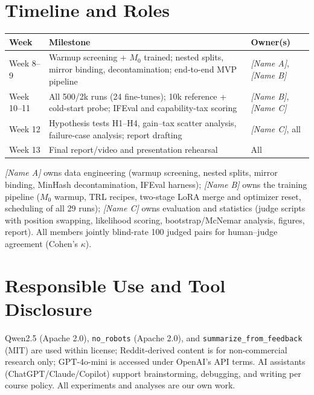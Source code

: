 \documentclass[11pt]{article}
\newcommand{\tempnote}[1]{\textcolor{NoteColor}{\textit{#1}}}
\newcommand{\placeholder}[1]{\tempnote{[#1]}}
\begin{document}
\section{Timeline and Roles}
\begin{tabularx}{\linewidth}{@{}l X l@{}}
\toprule
\textbf{Week} & \textbf{Milestone} & \textbf{Owner(s)} \\
\midrule
Week 8--9 & Warmup screening + $M_0$ trained; nested splits, mirror binding, decontamination; end-to-end MVP pipeline & \placeholder{Name A}, \placeholder{Name B} \\
Week 10--11 & All 500/2k runs (24 fine-tunes); 10k reference + cold-start probe; IFEval and capability-tax scoring & \placeholder{Name B}, \placeholder{Name C} \\
Week 12 & Hypothesis tests H1--H4, gain--tax scatter analysis, failure-case analysis; report drafting & \placeholder{Name C}, all \\
Week 13 & Final report/video and presentation rehearsal & All \\
\bottomrule
\end{tabularx}

\vspace{0.4em}
\placeholder{Name A} owns data engineering (warmup screening, nested splits, mirror binding, MinHash decontamination, IFEval harness); \placeholder{Name B} owns the training pipeline ($M_0$ warmup, TRL recipes, two-stage LoRA merge and optimizer reset, scheduling of all 29 runs); \placeholder{Name C} owns evaluation and statistics (judge scripts with position swapping, likelihood scoring, bootstrap/McNemar analysis, figures, report). All members jointly blind-rate 100 judged pairs for human--judge agreement (Cohen's $\kappa$).

\section{Responsible Use and Tool Disclosure}

Qwen2.5 (Apache 2.0), \texttt{no\_robots} (Apache 2.0), and \texttt{summarize\_from\_feedback} (MIT) are used within license; Reddit-derived content is for non-commercial research only; GPT-4o-mini is accessed under OpenAI's API terms. AI assistants (ChatGPT/Claude/Copilot) support brainstorming, debugging, and writing per course policy. All experiments and analyses are our own work.
\end{document}
